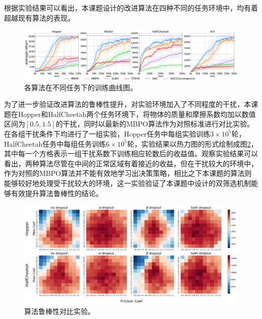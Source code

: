 根据实验结果可以看出，本课题设计的改进算法在四种不同的任务环境中，均有着超越现有算法的表现。

\begin{figure}
  \centering
  \includegraphics[width=\textwidth]{figures/performance.pdf}
  \caption{各算法在不同任务下的训练曲线图。}
  \label{fig:performance}
\end{figure}

为了进一步验证改进算法的鲁棒性提升，对实验环境加入了不同程度的干扰，本课题在Hopper和HalfCheetah两个任务环境下，将物体的质量和摩擦系数均加以数值区间为$[0.5,1.5]$的干扰，同时以最新的MBPO算法作为对照标准进行对比实验。在各组干扰条件下均进行了一组实验，Hopper任务中每组实验训练$3\times 10^5$轮，HalfCheetah任务中每组任务训练$6\times 10^5$轮，实验结果以热力图的形式绘制成图\ref{fig:robustness-heatmap}，其中每一个方格表示一组干扰系数下训练相应轮数后的收益值。观察实验结果可以看出，两种算法尽管在中间的正常区域有着接近的收益，但在干扰较大的环境中，作为对照的MBPO算法并不能有效地学习出决策策略，相比之下本课题的算法则能够较好地处理受干扰较大的环境，这一实验验证了本课题中设计的双筛选机制能够有效提升算法鲁棒性的结论。

\begin{figure}
  \centering
  \includegraphics[width=\textwidth]{figures/robustness-heatmap.pdf}
  \caption{算法鲁棒性对比实验。}
  \label{fig:robustness-heatmap}
\end{figure}